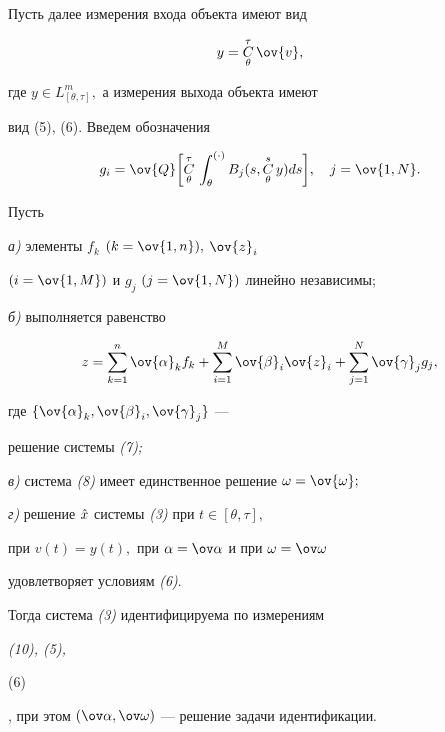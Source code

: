 Пусть далее измерения входа объекта имеют вид


\begin{equation}


y=\updown{\theta}{\tau} \ov{v},


\end{equation}


где $y\in L^m_{[\theta,\tau]},$ а измерения выхода объекта имеют


вид (5), (6). Введем обозначения


$$


g_i=\ov{Q}\biggl[\updown{\theta}{\tau} \int_{\theta}^{(\cdot)}


B_j(s,\updown{\theta}{s} y)ds\biggr],\quad j=\ov{1,N}.


$$





\begin{thm} Пусть





{\em а)} элементы $f_k$ $(k=\ov{1,n}),$ $\ov{z}_i$


$(i=\ov{1,M})$ и $g_j$ $(j=\ov{1,N})$ линейно независимы;





{\em б)} выполняется равенство


$$


z=\sum_{k=1}^n\ov{\alpha}_k f_k +


\sum_{i=1}^M\ov{\beta}_i \ov{z}_i +


\sum_{j=1}^N\ov{\gamma}_j g_j,


$$


где $\{\ov{\alpha}_k,\ov{\beta}_i, \ov{\gamma}_j\}$ ---


решение системы {\em (7);}





{\em в)} система {\em (8)} имеет единственное решение $\omega=\ov{\omega};$





{\em г)} решение $\Hat{x}$ системы {\em (3)} при $t\in[\theta,\tau],$


при $v(t) = y(t),$ при $\alpha = \ov\alpha$ и при $\omega=\ov\omega$


удовлетворяет условиям {\em (6)}.





Тогда система {\em (3)} идентифицируема по измерениям {\em (10), (5),


(6)}, при этом $(\ov\alpha,\ov\omega)$ --- решение задачи идентификации.


\end{thm}





